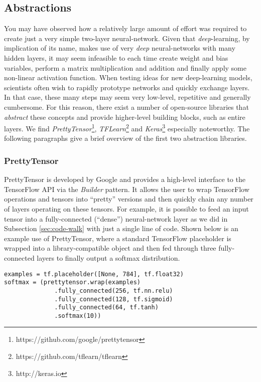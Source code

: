 \subsection{Abstractions}\label{sec:code-abstract}

You may have observed how a relatively large amount of effort was required to
create just a very simple two-layer neural-network. Given that
\emph{deep}-learning, by implication of its name, makes use of very \emph{deep}
neural-networks with many hidden layers, it may seem infeasible to each time
create weight and bias variables, perform a matrix multiplication and addition
and finally apply some non-linear activation function. When testing ideas for
new deep-learning models, scientists often wish to rapidly prototype networks
and quickly exchange layers. In that case, these many steps may seem very
low-level, repetitive and generally cumbersome. For this reason, there exist a
number of open-source libraries that \emph{abstract} these concepts and provide
higher-level building blocks, such as entire layers. We find
\emph{PrettyTensor}\footnote{https://github.com/google/prettytensor},
\emph{TFLearn}\footnote{https://github.com/tflearn/tflearn} and
\emph{Keras}\footnote{http://keras.io} especially noteworthy. The following
paragraphs give a brief overview of the first two abstraction libraries.

\subsubsection{PrettyTensor}\label{sec:code-abstract-prettytensor}

PrettyTensor is developed by Google and provides a high-level interface to the
TensorFlow API via the \emph{Builder} pattern. It allows the user to wrap
TensorFlow operations and tensors into ``pretty'' versions and then quickly
chain any number of layers operating on these tensors. For example, it is
possible to feed an input tensor into a fully-connected (``dense'')
neural-network layer as we did in Subsection \ref{sec:code-walk} with just a
single line of code. Shown below is an example use of PrettyTensor, where a
standard TensorFlow placeholder is wrapped into a library-compatible object and
then fed through three fully-connected layers to finally output a softmax
distribution.

\begin{lstlisting}
examples = tf.placeholder([None, 784], tf.float32)
softmax = (prettytensor.wrap(examples)
              .fully_connected(256, tf.nn.relu)
              .fully_connected(128, tf.sigmoid)
              .fully_connected(64, tf.tanh)
              .softmax(10))
\end{lstlisting}

